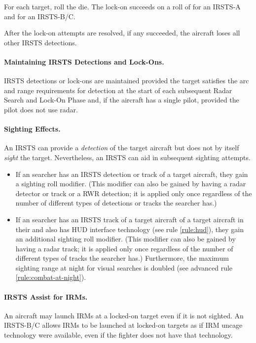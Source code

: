 {\begin{advancedrules}
{For each target, roll the die. The lock-on succeeds on a roll of  for an IRSTS-A and  for an IRSTS-B/C. 

After the lock-on attempts are resolved, if any succeeded, the aircraft loses all other IRSTS detections.

\paragraph{Maintaining IRSTS Detections and Lock-Ons.} IRSTS detections or lock-ons are maintained provided the target satisfies the arc and range requirements for detection at the start of each subsequent Radar Search and Lock-On Phase and, if the aircraft has a single pilot, provided the pilot does not use radar.

\paragraph{Sighting Effects.}
An IRSTS can provide a \emph{detection} of the target aircraft but does not by itself \emph{sight} the target. Nevertheless, an IRSTS can aid in subsequent sighting attempts. 

\begin{itemize}
\item If an searcher has an IRSTS detection or track of a target aircraft, they gain a  sighting roll modifier. (This modifier can also be gained by having a radar detector or track or a RWR detection; it is applied only once regardless of the number of different types of detections or tracks the searcher has.)
\item
If an searcher has an IRSTS track of a target aircraft of a target aircraft in their   and also has HUD interface technology (see rule \ref{rule:hud}), they gain an additional  sighting roll modifier.  (This modifier can also be gained by having a radar track; it is applied only once regardless of the number of different types of tracks the searcher has.) Furthermore, the maximum sighting range at night for visual searches is doubled (see advanced rule \ref{rule:combat-at-night}).
\end{itemize}

\paragraph{IRSTS Assist for IRMs.} An aircraft may launch IRMs at a locked-on target even if it is not sighted. An IRSTS-B/C allows IRMs to be launched at locked-on targets as if IRM uncage technology were available, even if the fighter does not have that technology.

}

\end{advancedrules}

}


